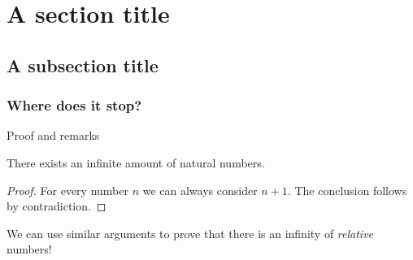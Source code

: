 \documentclass[aspectratio=169,10pt]{beamer}
\begin{document}
\section{A section title}

\subsection{A subsection title}

\subsubsection{Where does it stop?}

\begin{frame}{Proof and remarks}
\begin{theorem}[Someone - 1000 B.E.]
There exists an infinite amount of natural numbers.
\end{theorem}

\begin{proof}
For every number $n$ we can always consider $n+1$. The conclusion follows by contradiction.
\end{proof}

\begin{remark}
We can use similar arguments to prove that there is an infinity of \emph{relative} numbers!
\end{remark}
\end{frame}
\end{document}
